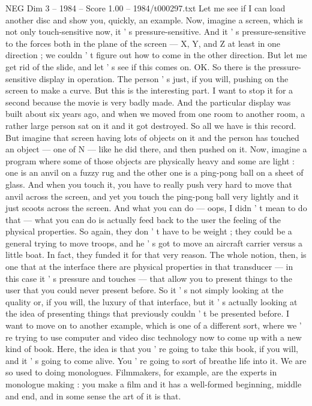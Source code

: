\begin{textsample}{NEG Dim 3 – 1984 – Score 1.00 – 1984/t000297.txt}
Let me see if I can load another disc and show you, quickly, an example.
Now, imagine a screen, which is not only touch-sensitive now, it ' s pressure-sensitive.
And it ' s pressure-sensitive to the forces both in the plane of the screen — X, Y, and Z at least in one direction ; we couldn ' t figure out how to come in the other direction.
But let me get rid of the slide, and let ' s see if this comes on.
OK.
So there is the pressure-sensitive display in operation.
The person ' s just, if you will, pushing on the screen to make a curve.
But this is the interesting part.
I want to stop it for a second because the movie is very badly made.
And the particular display was built about six years ago, and when we moved from one room to another room, a rather large person sat on it and it got destroyed.
So all we have is this record.
But imagine that screen having lots of objects on it and the person has touched an object — one of N — like he did there, and then pushed on it.
Now, imagine a program where some of those objects are physically heavy and some are light : one is an anvil on a fuzzy rug and the other one is a ping-pong ball on a sheet of glass.
And when you touch it, you have to really push very hard to move that anvil across the screen, and yet you touch the ping-pong ball very lightly and it just scoots across the screen.
And what you can do — oops, I didn ' t mean to do that — what you can do is actually feed back to the user the feeling of the physical properties.
So again, they don ' t have to be weight ; they could be a general trying to move troops, and he ' s got to move an aircraft carrier versus a little boat.
In fact, they funded it for that very reason.
The whole notion, then, is one that at the interface there are physical properties in that transducer — in this case it ' s pressure and touches — that allow you to present things to the user that you could never present before.
So it ' s not simply looking at the quality or, if you will, the luxury of that interface, but it ' s actually looking at the idea of presenting things that previously couldn ' t be presented before.
I want to move on to another example, which is one of a different sort, where we ' re trying to use computer and video disc technology now to come up with a new kind of book.
Here, the idea is that you ' re going to take this book, if you will, and it ' s going to come alive.
You ' re going to sort of breathe life into it.
We are so used to doing monologues.
Filmmakers, for example, are the experts in monologue making : you make a film and it has a well-formed beginning, middle and end, and in some sense the art of it is that.

\end{textsample}
